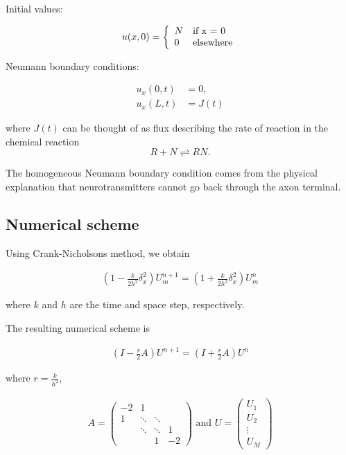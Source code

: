 Initial values:

\[ u(x,0) = \left\{ 
  \begin{array}{l l}
    N & \text{if x = 0}\\
    0 & \text{elsewhere}
  \end{array} \right.\]

Neumann boundary conditions:

\begin{align*}
u_x(0,t) &= 0, \\
u_x(L,t) &= J(t)
\end{align*}

where $J(t)$ can be thought of as flux describing the rate of reaction in the chemical reaction
\begin{equation}
R + N \rightleftharpoons RN.
\end{equation}

The homogeneous Neumann boundary condition comes from the physical explanation that neurotransmitters cannot go back through the axon terminal.

\subsection*{Numerical scheme}

Using Crank-Nicholsons method, we obtain 

\begin{align*}
(1 - \frac{k}{2h^2} \delta^2_x)U^{n+1}_m = (1 + \frac{k}{2h^2} \delta^2_x) U_m^n
\end{align*}

where $k$ and $h$ are the time and space step, respectively. 

The resulting numerical scheme is

\begin{align*}
\left(I - \frac{r}{2} A\right) U^{n+1} = \left(I + \frac{r}{2} A\right) U^n
\end{align*}

where $r = \frac{k}{h^2}$,


\begin{align*}
A = 
\begin{pmatrix}
  -2 & 1 &  &  \\
  1 & \ddots & \ddots &  \\
    & \ddots  & \ddots & 1 \\
   &  & 1 & -2
\end{pmatrix} 
\textrm{ and }
U = \begin{pmatrix}
U_1 \\
U_2 \\
\vdots \\
U_{M} 
\end{pmatrix}
\end{align*}



